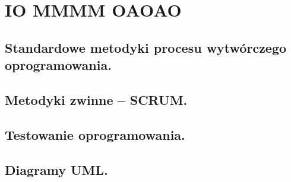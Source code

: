 \chapter{IO MMMM OAOAO}
\section{Standardowe metodyki procesu wytwórczego oprogramowania.}
\section{Metodyki zwinne – SCRUM.}
\section{Testowanie oprogramowania.}
\section{Diagramy UML. }
